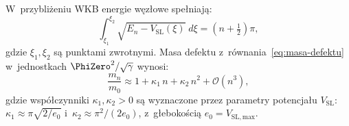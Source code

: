 \begin{theorem}%
\label{thm:mass-spectrum}
W~przybli\.zeniu WKB energie w\k{e}z\l{}owe spe\l{}niaj\k{a}:
\begin{equation}\label{eq:WKB-quantization}
    \int_{\xi_1}^{\xi_2}
    \sqrt{E_n - V_{\mathrm{SL}}(\xi)}\;d\xi
    = \left(n + \tfrac{1}{2}\right)\pi,
\end{equation}
gdzie $\xi_1, \xi_2$ s\k{a} punktami zwrotnymi.
Masa defektu z~r\'ownania~\eqref{eq:masa-defektu} w~jednostkach
$\PhiZero^2 / \sqrt{\gamma}$ wynosi:
\begin{equation}\label{eq:mass-nodal}
    \frac{m_n}{m_0}
    \approx
    1 + \kappa_1\,n + \kappa_2\,n^2 + \mathcal{O}(n^3),
\end{equation}
gdzie wspó\l{}czynniki $\kappa_1, \kappa_2 > 0$ s\k{a} wyznaczone
przez parametry potencja\l{}u $V_{\mathrm{SL}}$:
$\kappa_1 \approx \pi\sqrt{2/e_0}$ i~$\kappa_2 \approx \pi^2/(2 e_0)$,
z~g\l{}ebokością $e_0 = V_{\mathrm{SL,max}}$.
\end{theorem}

